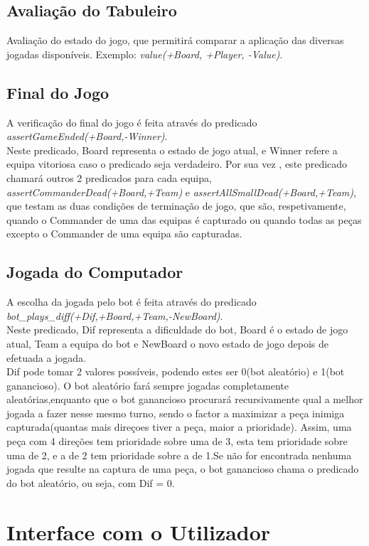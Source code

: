\documentclass[a4paper]{article}
\begin{document}
\subsection{Avaliação do Tabuleiro} Avaliação do estado do jogo, que permitirá comparar a aplicação das diversas jogadas disponíveis. Exemplo: \textit{value(+Board, +Player, -Value)}.

\subsection{Final do Jogo} A verificação do final do jogo é feita através do predicado \textit{assertGameEnded(+Board,-Winner)}.\\
Neste predicado, Board representa o estado de jogo atual, e Winner refere a equipa vitoriosa caso o predicado seja verdadeiro.
Por sua vez , este predicado chamará outros 2 predicados para cada equipa, \textit{assertCommanderDead(+Board,+Team)} e \textit{assertAllSmallDead(+Board,+Team)}, que testam as duas condições de terminação de jogo, que são, respetivamente, quando o Commander de uma das equipas é capturado ou quando todas as peças excepto o Commander de uma equipa são capturadas.

\subsection{Jogada do Computador} A escolha da jogada pelo bot é feita através do predicado \textit{bot\_plays\_diff(+Dif,+Board,+Team,-NewBoard)}. \\
Neste predicado, Dif representa a dificuldade do bot, Board é o estado de jogo atual, Team a equipa do bot e NewBoard o novo estado de jogo depois de efetuada a jogada. \\
Dif pode tomar 2 valores possíveis, podendo estes ser 0(bot aleatório) e 1(bot ganancioso).
O bot aleatório fará sempre jogadas completamente aleatórias,enquanto que o bot ganancioso procurará recursivamente qual a melhor jogada a fazer nesse mesmo turno, sendo o factor a maximizar a peça inimiga capturada(quantas mais direçoes tiver a peça, maior a prioridade).
Assim, uma peça com 4 direções tem prioridade sobre uma de 3, esta tem prioridade sobre uma de 2, e a de 2 tem prioridade sobre a de 1.Se não for encontrada nenhuma jogada que resulte na captura de uma peça, o bot ganancioso chama o predicado do bot aleatório, ou seja, com Dif = 0.



\section{Interface com o Utilizador}
\end{document}
